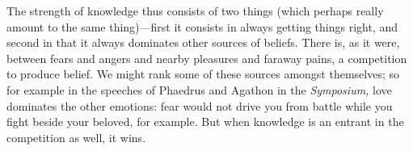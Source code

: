 \documentclass[11pt]{amsart}
\begin{document}

The strength of knowledge thus consists of two things (which perhaps really amount to the same thing)---first it consists in always getting things right, and second in that it always dominates other sources of beliefs. There is, as it were, between fears and angers and nearby pleasures and faraway pains, a competition to produce belief. We might rank some of these sources amongst themselves; so for example in the speeches of Phaedrus and Agathon in the \emph{Symposium,} love dominates the other emotions: fear would not drive you from battle while you fight beside your beloved, for example. But when knowledge is an entrant in the competition as well, it wins.

\end{document}
